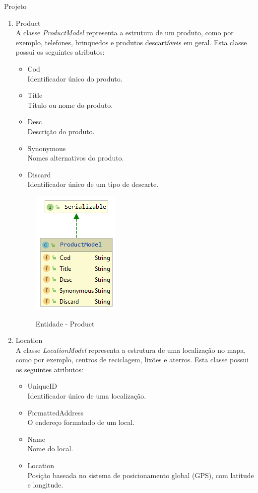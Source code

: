 \documentclass[
	12pt,				%
	openright,			%
	twoside,			%
	a4paper,			%
	english,			%
	french,				%
	spanish,			%
	brazil				%
	]{abntex2}
\begin{document}
\begin{chapter}{Projeto}
\begin{enumerate}
  \item{Product} \\ A classe \textit{ProductModel} representa a estrutura de um produto, como por exemplo, telefones, brinquedos e produtos descartáveis em geral. Esta classe possui os seguintes atributos:
  
     \begin{itemize}
  \item{Cod}\\ Identificador único do produto.
     \item{Title}\\ Titulo ou nome do produto.
       \item{Desc}\\ Descrição do produto.
         \item{Synonymous}\\ Nomes alternativos do produto.
                  \item{Discard}\\ Identificador único de um tipo de descarte.
\end{itemize}
  
\begin{figure}[h]
\centering
   \caption{Entidade - Product}
   \includegraphics[scale=1.0]{media/ProductModel.png}
     \label{fig:productModel}
\end{figure}


  \item{Location}  \\ A classe \textit{LocationModel} representa a estrutura de uma localização no mapa, como por exemplo, centros de reciclagem, lixões e aterros. Esta classe possui os seguintes atributos:
  
       \begin{itemize}
  \item{UniqueID}\\ Identificador único de uma localização.
     \item{FormattedAddress}\\ O endereço formatado de um local.
       \item{Name}\\ Nome do local.
         \item{Location}\\ Posição baseada no sistema de posicionamento global (GPS), com latitude e longitude.
\end{itemize}
  

\end{enumerate}
\end{chapter}
\end{document}
